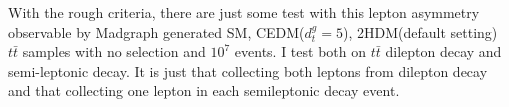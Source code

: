 			With the rough criteria, there are just some test with this lepton asymmetry observable by Madgraph generated SM, CEDM($d_t^g = 5$), 2HDM(default setting) $t\bar{t}$ samples with no selection and $10^7$ events. I test both on $t\bar{t}$ dilepton decay and semi-leptonic decay. It is just that collecting both leptons from dilepton decay and that collecting one lepton in each semileptonic decay event. 

			\begin{figure}[H]
			\centering
			    \\
			\end{figure}
